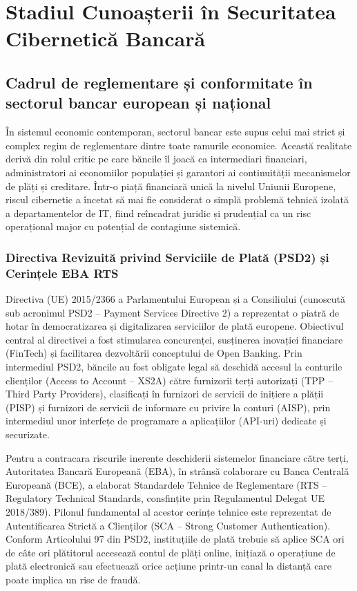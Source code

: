 \chapter{Stadiul Cunoașterii în Securitatea Cibernetică Bancară}

\section{Cadrul de reglementare și conformitate în sectorul bancar european și național}

În sistemul economic contemporan, sectorul bancar este supus celui mai strict și complex regim de reglementare dintre toate ramurile economice. Această realitate derivă din rolul critic pe care băncile îl joacă ca intermediari financiari, administratori ai economiilor populației și garantori ai continuității mecanismelor de plăți și creditare. Într-o piață financiară unică la nivelul Uniunii Europene, riscul cibernetic a încetat să mai fie considerat o simplă problemă tehnică izolată a departamentelor de IT, fiind reîncadrat juridic și prudențial ca un risc operațional major cu potențial de contagiune sistemică.

\subsection{Directiva Revizuită privind Serviciile de Plată (PSD2) și Cerințele EBA RTS}

Directiva (UE) 2015/2366 a Parlamentului European și a Consiliului (cunoscută sub acronimul PSD2 – Payment Services Directive 2) a reprezentat o piatră de hotar în democratizarea și digitalizarea serviciilor de plată europene. Obiectivul central al directivei a fost stimularea concurenței, susținerea inovației financiare (FinTech) și facilitarea dezvoltării conceptului de Open Banking. Prin intermediul PSD2, băncile au fost obligate legal să deschidă accesul la conturile clienților (Access to Account – XS2A) către furnizorii terți autorizați (TPP – Third Party Providers), clasificați în furnizori de servicii de inițiere a plății (PISP) și furnizori de servicii de informare cu privire la conturi (AISP), prin intermediul unor interfețe de programare a aplicațiilor (API-uri) dedicate și securizate.

Pentru a contracara riscurile inerente deschiderii sistemelor financiare către terți, Autoritatea Bancară Europeană (EBA), în strânsă colaborare cu Banca Centrală Europeană (BCE), a elaborat Standardele Tehnice de Reglementare (RTS – Regulatory Technical Standards, consfințite prin Regulamentul Delegat UE 2018/389). Pilonul fundamental al acestor cerințe tehnice este reprezentat de Autentificarea Strictă a Clienților (SCA – Strong Customer Authentication). Conform Articolului 97 din PSD2, instituțiile de plată trebuie să aplice SCA ori de câte ori plătitorul accesează contul de plăți online, inițiază o operațiune de plată electronică sau efectuează orice acțiune printr-un canal la distanță care poate implica un risc de fraudă.

